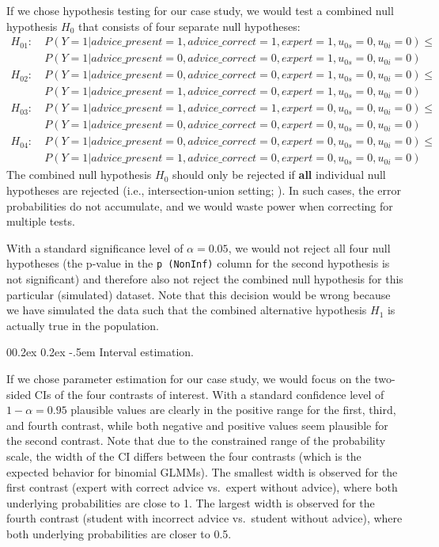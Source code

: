 \documentclass[
  man,
  floatsintext,
  longtable,
  a4paper,
  nolmodern,
  notxfonts,
  notimes,
  colorlinks=true,linkcolor=blue,citecolor=blue,urlcolor=blue]{apa7}
\makeatletter
\renewcommand{\paragraph}{\@startsection{paragraph}{4}{\parindent}%
	{0\baselineskip \@plus 0.2ex \@minus 0.2ex}%
	{-.5em}%
	{\normalfont\normalsize\bfseries\typesectitle}}
\makeatother
\begin{document}
If we chose hypothesis testing for our case study, we would test a
combined null hypothesis \(H_0\) that consists of four separate null
hypotheses: \[
\begin{aligned}
H_{01}:\ & P(Y=1|advice\_present = 1, advice\_correct = 1, expert = 1, u_{0s} = 0, u_{0i} = 0) \leq \\
& P(Y=1|advice\_present = 0, advice\_correct = 0, expert = 1, u_{0s} = 0, u_{0i} = 0) \\
H_{02}:\ &P(Y=1|advice\_present = 0, advice\_correct = 0, expert = 1, u_{0s} = 0, u_{0i} = 0) \leq \\
& P(Y=1|advice\_present = 1, advice\_correct = 0, expert = 1, u_{0s} = 0, u_{0i} = 0) \\
H_{03}:\ &P(Y=1|advice\_present = 1, advice\_correct = 1, expert = 0, u_{0s} = 0, u_{0i} = 0) \leq \\
& P(Y=1|advice\_present = 0, advice\_correct = 0, expert = 0, u_{0s} = 0, u_{0i} = 0) \\
H_{04}:\ & P(Y=1|advice\_present = 0, advice\_correct = 0, expert = 0, u_{0s} = 0, u_{0i} = 0) \leq \\
& P(Y=1|advice\_present = 1, advice\_correct = 0, expert = 0, u_{0s} = 0, u_{0i} = 0)
\end{aligned}
\] The combined null hypothesis \(H_0\) should only be rejected if
\textbf{all} individual null hypotheses are rejected (i.e.,
intersection-union setting;
). In such cases, the error probabilities do not
accumulate, and we would waste power when correcting for multiple tests.

With a standard significance level of \(\alpha = 0.05\), we would not
reject all four null hypotheses (the p-value in the \texttt{p\ (NonInf)}
column for the second hypothesis is not significant) and therefore also
not reject the combined null hypothesis for this particular (simulated)
dataset. Note that this decision would be wrong because we have
simulated the data such that the combined alternative hypothesis \(H_1\)
is actually true in the population.

\paragraph{Interval estimation.}\label{interval-estimation}

If we chose parameter estimation for our case study, we would focus on
the two-sided CIs of the four contrasts of interest. With a standard
confidence level of \(1 - \alpha = 0.95\) plausible values are clearly
in the positive range for the first, third, and fourth contrast, while
both negative and positive values seem plausible for the second
contrast. Note that due to the constrained range of the probability
scale, the width of the CI differs between the four contrasts (which is
the expected behavior for binomial GLMMs). The smallest width is
observed for the first contrast (expert with correct advice vs.~expert
without advice), where both underlying probabilities are close to 1. The
largest width is observed for the fourth contrast (student with
incorrect advice vs.~student without advice), where both underlying
probabilities are closer to 0.5.
\end{document}
